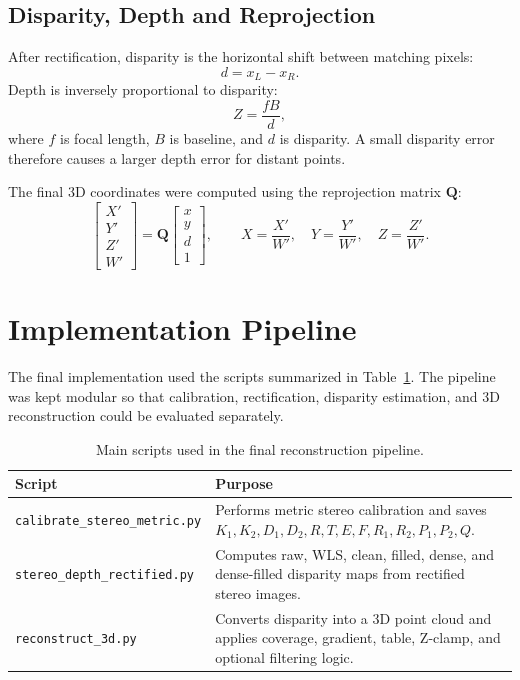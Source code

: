 \documentclass[11pt,a4paper]{article}
\newcommand{\mat}[1]{\mathbf{#1}}
\begin{document}
\subsection{Disparity, Depth and Reprojection}

After rectification, disparity is the horizontal shift between matching pixels:
\begin{equation}
    d = x_L - x_R.
\end{equation}
Depth is inversely proportional to disparity:
\begin{equation}
    Z = \frac{fB}{d},
\end{equation}
where \(f\) is focal length, \(B\) is baseline, and \(d\) is disparity. A small disparity error therefore causes a larger depth error for distant points.

The final 3D coordinates were computed using the reprojection matrix \(\mat{Q}\):
\begin{equation}
    \begin{bmatrix}X'\\Y'\\Z'\\W'\end{bmatrix}
    =
    \mat{Q}
    \begin{bmatrix}x\\y\\d\\1\end{bmatrix},
    \qquad
    X=\frac{X'}{W'},\quad Y=\frac{Y'}{W'},\quad Z=\frac{Z'}{W'}.
\end{equation}

\section{Implementation Pipeline}

The final implementation used the scripts summarized in Table~\ref{tab:scripts}. The pipeline was kept modular so that calibration, rectification, disparity estimation, and 3D reconstruction could be evaluated separately.

\begin{table}[H]
\centering
\caption{Main scripts used in the final reconstruction pipeline.}
\label{tab:scripts}
\begin{tabular}{p{}p{}}
\toprule
\textbf{Script} & \textbf{Purpose} \\
\midrule
\texttt{calibrate\_stereo\_metric.py} & Performs metric stereo calibration and saves \(K_1,K_2,D_1,D_2,R,T,E,F,R_1,R_2,P_1,P_2,Q\). \\
\texttt{stereo\_depth\_rectified.py} & Computes raw, WLS, clean, filled, dense, and dense-filled disparity maps from rectified stereo images. \\
\texttt{reconstruct\_3d.py} & Converts disparity into a 3D point cloud and applies coverage, gradient, table, Z-clamp, and optional filtering logic. \\
\bottomrule
\end{tabular}
\end{table}
\end{document}
